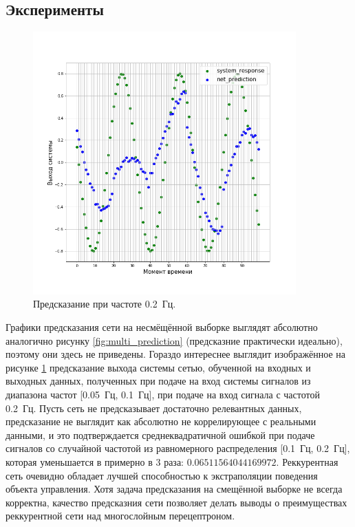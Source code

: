 \documentclass[12pt, oneside]{extbook}
\begin{document}
\begin{flushleft}
\section{Эксперименты}
\par
\begin{figure}[h]
\centering
\includegraphics[width=0.9\textwidth]{rnn_prediction_shifted}
\caption{Предсказание при частоте 0.2~Гц.}
\label{fig:lstm_prediction_shifted}
\end{figure}
Графики предсказания сети на несмёщённой выборке выглядят абсолютно аналогично рисунку \ref{fig:multi_prediction} (предсказние практически идеально), поэтому они здесь не приведены. Гораздо интереснее выглядит изображённое на рисунке \ref{fig:lstm_prediction_shifted} предсказание выхода системы сетью, обученной на входных и выходных данных, полученных при подаче на вход системы сигналов из диапазона частот [0.05~Гц, 0.1~Гц], при подаче на вход сигнала с частотой 0.2~Гц. Пусть сеть не предсказывает достаточно релевантных данных, предсказание не выглядит как абсолютно не коррелирующее с реальными данными, и это подтверждается среднеквадратичной ошибкой при подаче сигналов со случайной частотой из равномерного распределения [0.1~Гц, 0.2~Гц], которая уменьшается в примерно в 3 раза: $0.06511564044169972$. Реккурентная сеть очевидно обладает лучшей способностью к экстраполяции поведения объекта управления. Хотя задача предсказания на смещённой выборке не всегда корректна, качество предсказния сети позволяет делать выводы о преимуществах реккурентной сети над многослойным перецептроном. 

\end{flushleft}
\end{document}
